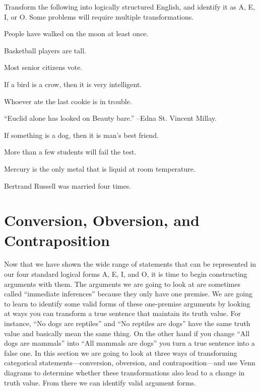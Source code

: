 \noindent\problempart Transform the following into logically structured English, and identify it as A, E, I, or O. Some problems will require multiple transformations.

\begin{exercises}
\item People have walked on the moon at least once. 
\item Basketball players are tall.
\item Most senior citizens vote.
\item If a bird is a crow, then it is very intelligent. 
\item Whoever ate the last cookie is in trouble.
\item ``Euclid alone has looked on Beauty bare.'' --Edna St. Vincent Millay.
\item If something is a dog, then it is man's best friend.
\item More than a few students will fail the test.
\item Mercury is the only metal that is liquid at room temperature. 
\item Bertrand Russell was married four times.
\end{exercises}



\section{Conversion, Obversion, and Contraposition}
\label{sec:conv_obv_cont}
Now that we have shown the wide range of statements that can be represented in our four standard logical forms A, E, I, and O, it is time to begin constructing arguments with them. The arguments we are going to look at are sometimes called ``immediate inferences'' because they only have one premise. We are going to learn to identify some valid forms of these one-premise arguments by looking at ways you can transform a true sentence that maintain its truth value. For instance, ``No dogs are reptiles'' and ``No reptiles are dogs'' have the same truth value and basically mean the same thing. On the other hand if you change ``All dogs are mammals'' into ``All mammals are dogs'' you turn a true sentence into a false one. In this section we are going to look at three ways of transforming categorical statements---conversion, obversion, and contraposition---and use Venn diagrams to determine whether these transformations also lead to a change in truth value. From there we can identify valid argument forms. 

